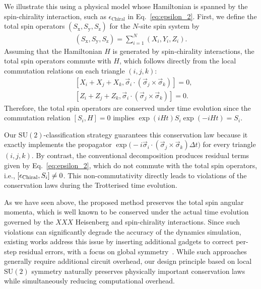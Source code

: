 \documentclass[aps,showpacs,amsmath,amssymb,twocolumn,prx,longbibliography,superscriptaddress,notitlepage,floatfix,10pt]{revtex4-2}
\begin{document}
We illustrate this using a physical model whose Hamiltonian is spanned by the spin-chirality interaction, such as $\epsilon_{\mathrm{Chiral}}$ in Eq.~\eqref{eq:epsilon_2}.
First, we define the total spin operators $(S_{\mathrm{x}},S_{\mathrm{y}},S_{\mathrm{z}})$ for the $N$-site spin system by
\begin{equation}
\begin{split}
    (S_{\mathrm{x}},S_{\mathrm{y}},S_{\mathrm{z}})=\sum_{i=1}^{N}(X_{i},Y_{i},Z_{i}).
\end{split}
\end{equation}
Assuming that the Hamiltonian $H$ is generated by spin-chirality interactions, the total spin operators commute with $H$, which follows directly from the local commutation
relations on each triangle $(i,j,k)$:
\begin{equation}\label{eq:commute}
\begin{split}
    &[X_{i}+X_{j}+X_{k},\vec{\sigma}_{i} \cdot (\vec{\sigma}_{j} \times \vec{\sigma}_{k})]=0,\\
    &[Z_{i}+Z_{j}+Z_{k},\vec{\sigma}_{i} \cdot (\vec{\sigma}_{j} \times \vec{\sigma}_{k})]=0.
\end{split}
\end{equation}
Therefore, the total spin operators are conserved under time evolution since the commutation relation $[S_{i}, H]=0$ implies $\exp(iHt)S_{i}\exp(-iHt)=S_{i}$.

Our $\mathrm{SU}(2)$-classification strategy guarantees this conservation law because it exactly implements the propagator $\exp\bigl(-i\vec{\sigma}_{i} \cdot (\vec{\sigma}_{j} \times \vec{\sigma}_{k})\Delta t\bigr)$
for every triangle $(i,j,k)$. By contrast, the conventional decomposition produces residual terms given by Eq.~\eqref{eq:epsilon_2}, which do not commute with the total spin operators, i.e., $[\epsilon_{\rm Chiral}, S_{i}]\neq0$.
This non-commutativity directly leads to violations of the conservation laws during the Trotterised time evolution.

As we have seen above, the proposed method preserves the total spin angular momenta, which is well known to be conserved under the actual time evolution governed by the $XXX$ Heisenberg and spin-chirality interactions.
Since such violations can significantly degrade the accuracy of the dynamics simulation, existing works address this issue by inserting additional gadgets to correct per-step residual errors, with a focus on global symmetry~\cite{Tran2021Faster, Zeng2025Simple}.
While such approaches generally require additional circuit overhead, our design principle based on local $\mathrm{SU}(2)$ symmetry naturally preserves physically important conservation laws while simultaneously reducing computational overhead.
\end{document}
